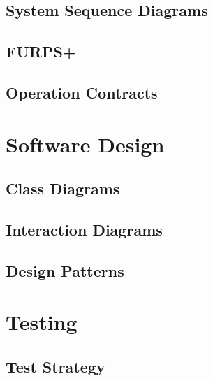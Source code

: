 \documentclass[a4paper,11pt]{article}
\begin{document}
\subsection{System Sequence Diagrams}


\subsection{FURPS+}


\subsection{Operation Contracts}


\pagebreak
\section{Software Design}


\subsection{Class Diagrams}


\subsection{Interaction Diagrams}


\subsection{Design Patterns}



\pagebreak

\pagebreak

\pagebreak
\section{Testing}


\subsection{Test Strategy}

\end{document}
